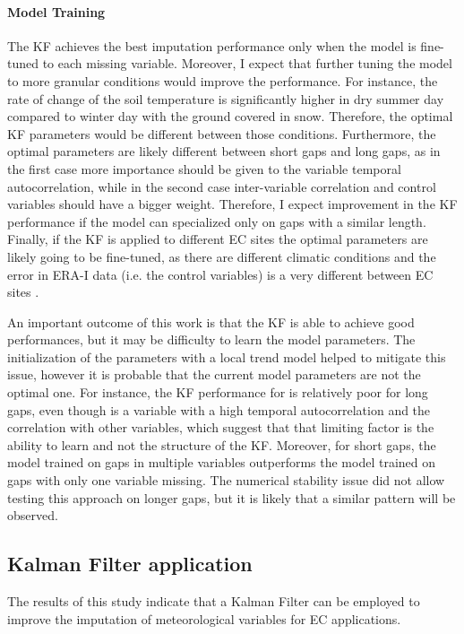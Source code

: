 \documentclass{article}
\let\Oldsubsection\subsection
\renewcommand{\subsection}{\FloatBarrier\Oldsubsection}
\begin{document}
\paragraph{Model Training} The KF achieves the best imputation performance only when the model is fine-tuned to each missing variable. 
Moreover, I expect that further tuning the model to more granular conditions would improve the performance.
For instance, the rate of change of the soil temperature is significantly  higher in dry summer day compared to winter day with the ground covered in snow. Therefore, the optimal KF parameters would be different between those conditions.
Furthermore, the optimal parameters are likely different between short gaps and long gaps, as in the first case more importance should be given to the variable temporal autocorrelation, while in the second case inter-variable correlation and control variables should have a bigger weight. Therefore, I expect improvement in the KF performance if the model can specialized only on gaps with a similar length.
Finally, if the KF is applied to different EC sites the optimal parameters are likely going to be fine-tuned, as there are different climatic conditions and the error in ERA-I data (i.e. the control variables) is a very different between EC sites \cite{vuichard_filling_2015}. 

An important outcome of this work is that the KF is able to achieve good performances, but it may be difficulty to learn the  model parameters. The initialization of the parameters with a local trend model helped to mitigate this issue, however it is probable that the current model parameters are not the optimal one. For instance, the KF performance for  is relatively poor for long gaps, even though is a variable with a high temporal autocorrelation and the correlation with other variables, which suggest that that limiting factor is the ability to learn and not the structure of the KF. Moreover, for short gaps, the model trained on gaps in multiple variables outperforms the model trained on gaps with only one variable missing. The numerical stability issue did not allow testing this approach on longer gaps, but it is likely that a similar pattern will be observed.


\subsection{Kalman Filter application}

The results of this study indicate that a Kalman Filter can be employed to improve the imputation of meteorological variables for EC applications.
\end{document}
